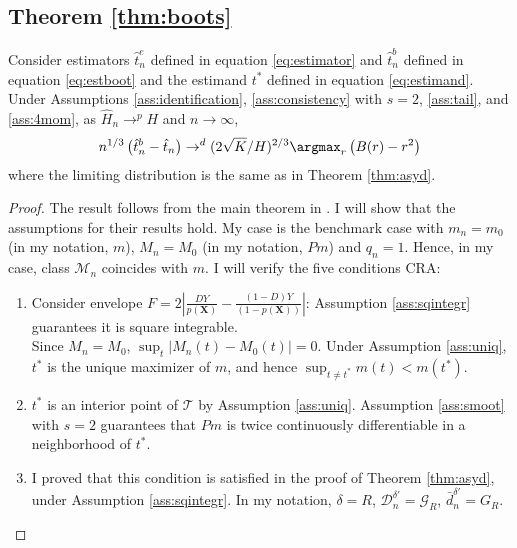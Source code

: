 {\subsection*{Theorem \ref{thm:boots}}
\begin{thm}
Consider estimators $\hat{t}^e_n$ defined in equation \eqref{eq:estimator} and $\hat{t}^b_n$ defined in equation \eqref{eq:estboot} and the estimand $t^*$ defined in equation \eqref{eq:estimand}. Under Assumptions \ref{ass:identification}, \ref{ass:consistency} with $s=2$, \ref{ass:tail}, and \ref{ass:4mom}, as $\hat{H}_n \rightarrow^p H$ and $n\rightarrow \infty$,
\begin{gather}
    n^{1 / 3}\left(\hat{t}^b_n - \hat{t}_n\right) \rightarrow^d (2\sqrt{K}/H)^{2/3}\argmax_r \left(B(r) - r^2 \right)
\end{gather}
where the limiting distribution is the same as in Theorem \ref{thm:asyd}.
\end{thm}
\begin{proof}
The result follows from the main theorem in \cite{cattaneo2020bootstrap}. I will show that the assumptions for their results hold. My case is the benchmark case with $m_n = m_0$ (in my notation, $m$), $M_n = M_0$ (in my notation, $P m$) and $q_n =1$. Hence, in my case, class $\mathcal{M}_n$ coincides with $m$. I will verify the five conditions CRA:
\begin{enumerate}
    \item Consider envelope $F = 2\left|\frac{D Y}{p(\textbf{X})} - \frac{(1-D) Y}{(1-p(\textbf{X}))}\right|$: Assumption \ref{ass:sqintegr} guarantees it is square integrable. \\
    Since $M_n = M_0$, $\sup_t |M_n(t) - M_0(t)| = 0$. Under Assumption \ref{ass:uniq}, $t^*$ is the unique maximizer of $m$, and hence $\sup_{t \neq t^*} m(t) < m(t^*)$.
    \item $t^*$ is an interior point of $\mathcal{T}$ by Assumption \ref{ass:uniq}. Assumption \ref{ass:smoot} with $s=2$ guarantees that $Pm$ is twice continuously differentiable in a neighborhood of $t^*$.

    \item I proved that this condition is satisfied in the proof of Theorem \ref{thm:asyd}, under Assumption \ref{ass:sqintegr}. In my notation, $\delta = R$, $\mathcal{D}_n^{\delta '} =\mathcal{G}_R$, $\bar d_n^{\delta '} = G_R$.


\end{enumerate}
\end{proof}}
